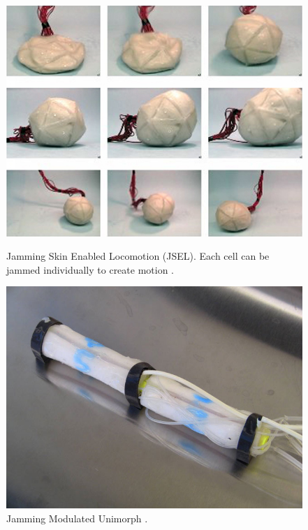 \begin{figure}
  \centering
  \begin{minipage}[t]{.44\textwidth}
    \centering
    \includegraphics[width=\linewidth]{figures/jamming/chembot-robot-blob}
    \caption[Jamming Skin Enabled Locomotion (JSEL) by \citet{steltz2009jsel}.]
    {Jamming Skin Enabled Locomotion (JSEL). Each cell can be jammed individually to create motion \citep{steltz2009jsel}.}
    \label{fig:ch:jamming:jsel}
    \hspace{.2\textwidth} 
  \end{minipage}%
  \hspace{0.02\textwidth}
  \begin{minipage}[t]{.44\textwidth}
    \centering
    \includegraphics[width=\linewidth]{figures/jamming/jmu-worm}
    \caption[Jamming Modulated Unimorph by \citet{steltz2010jamming}.]
    {Jamming Modulated Unimorph \citep{steltz2010jamming}.}
    \label{fig:ch:jamming:jmu}
  \end{minipage}
\end{figure}

